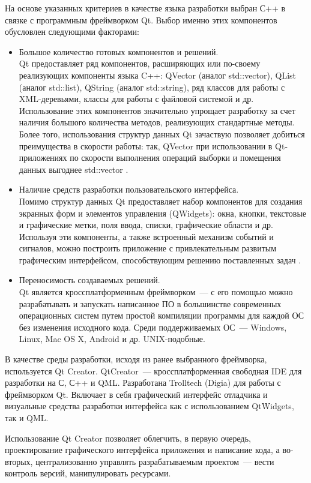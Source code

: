 На основе указанных критериев в качестве языка разработки выбран С++ в связке с программным фреймворком Qt.
Выбор именно этих компонентов обусловлен следующими факторами:
\begin{itemize}
  \item Большое количество готовых компонентов и решений.\\
  Qt предоставляет ряд компонентов, расширяющих или по-своему реализующих компоненты языка C++: QVector (аналог std::vector), QList (аналог std::list), QString (аналог std::string), ряд классов для работы с XML-деревьями, классы для работы с файловой системой и др.
  Использование этих компонентов значительно упрощает разработку за счет наличия большого количества методов, реализующих стандартные методы.
  Более того, использования структур данных Qt зачаствую позволяет добиться преимущества в скорости работы: так, QVector при использовании в Qt-приложениях по скорости выполнения операций выборки и помещения данных выгоднее std::vector \cite{qt}.
  \item Наличие средств разработки пользовательского интерфейса.\\
  Помимо структур данных Qt предоставляет набор компонентов для создания экранных форм и элементов управления (QWidgets): окна, кнопки, текстовые и графические метки, поля ввода, списки, графические области и др.
  Используя эти компоненты, а также встроенный механизм событий и сигналов, можно построить приложение с привлекательным развитым графическим интерфейсом, способствующим решению поставленных задач \cite{qt-creator}.
  \item Переносимость создаваемых решений.\\
  Qt является кроссплатформенным фреймворком~--- с его помощью можно разрабатывать и запускать написанное ПО в большинстве современных операционных систем путем простой компиляции программы для каждой ОС без изменения исходного кода.
  Среди поддерживаемых ОС~--- Windows, Linux, Mac OS X, Android и др. UNIX-подобные.
\end{itemize}

В качестве среды разработки, исходя из ранее выбранного фреймворка, используется Qt Creator.
QtCreator~--- кроссплатформенная свободная IDE для разработки на С, С++ и QML. Разработана Trolltech (Digia) для работы с фреймворком Qt.
Включает в себя графический интерфейс отладчика и визуальные средства разработки интерфейса как с использованием QtWidgets, так и QML.

Использование Qt Creator позволяет облегчить, в первую очередь, проектирование графического интерфейса приложения и написание кода, а во-вторых, централизованно управлять разрабатываемым проектом~--- вести контроль версий, манипулировать ресурсами.

